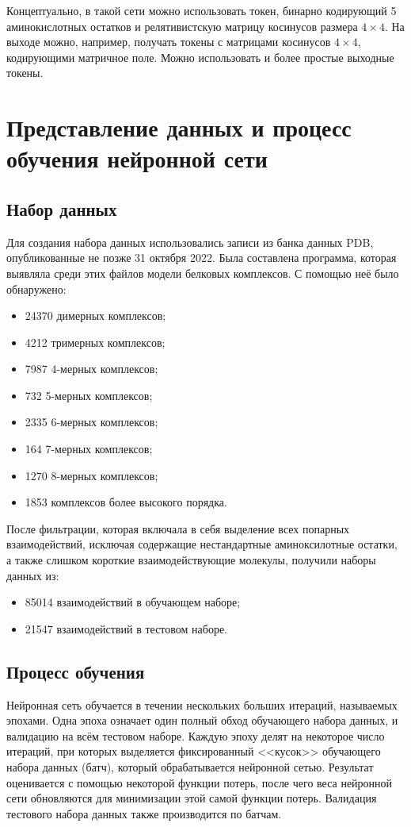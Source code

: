 Концептуально, в такой сети можно использовать токен, бинарно кодирующий 5 аминокислотных остатков и релятивистскую матрицу косинусов размера $4\times4$. На выходе можно, например, получать токены с матрицами косинусов $4\times4$, кодирующими матричное поле. Можно использовать и более простые выходные токены.

\section{Представление данных и процесс обучения нейронной сети}

\subsection{Набор данных}

Для создания набора данных использовались записи из банка данных PDB, опубликованные не позже 31 октября 2022. Была составлена программа, которая выявляла среди этих файлов модели белковых комплексов.
С помощью неё было обнаружено:
\begin{itemize}
\item 24370 димерных комплексов;
\item 4212 тримерных комплексов;
\item 7987 4-мерных комплексов;
\item 732 5-мерных комплексов;
\item 2335 6-мерных комплексов;
\item 164 7-мерных комплексов;
\item 1270 8-мерных комплексов;
\item 1853 комплексов более высокого порядка.
\end{itemize}

После фильтрации, которая включала в себя выделение всех попарных взаимодействий, исключая содержащие нестандартные аминоксилотные остатки, а также слишком короткие взаимодействующие молекулы, получили наборы данных из:
\begin{itemize}
\item 85014 взаимодействий в обучающем наборе; 
\item 21547 взаимодействий в тестовом наборе.
\end{itemize}

\subsection{Процесс обучения}
Нейронная сеть обучается в течении нескольких больших итераций, называемых эпохами. Одна эпоха означает один полный обход обучающего набора данных, и валидацию на всём тестовом наборе. Каждую эпоху делят на некоторое число итераций, при которых выделяется фиксированный <<кусок>> обучающего набора данных (батч), который обрабатывается нейронной сетью. Результат оценивается с помощью некоторой функции потерь, после чего веса нейронной сети обновляются для минимизации этой самой функции потерь. Валидация тестового набора данных также производится по батчам.

